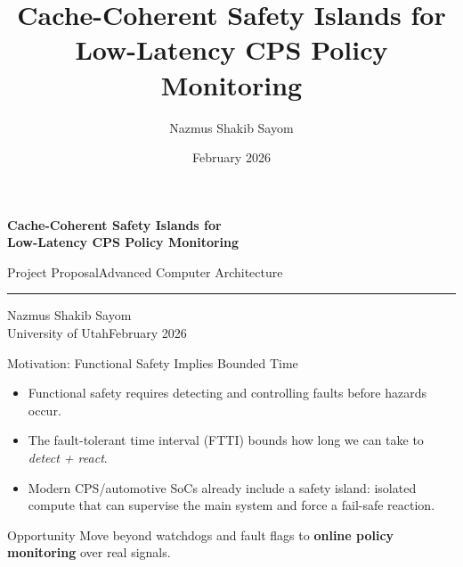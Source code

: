 \documentclass[aspectratio=169,12pt]{beamer}
\title{Cache-Coherent Safety Islands for Low-Latency CPS Policy Monitoring}
\author{Nazmus Shakib Sayom}
\institute{University of Utah}
\date{February 2026}
\newcommand{\hl}[1]{\textcolor{Accent}{\textbf{#1}}}
\newcommand{\SafetyIsland}{safety island\xspace}
\newcommand{\FTTI}{FTTI\xspace}
\begin{document}
\begin{frame}[plain]
  \vfill
  \begin{center}
    {\Large\bfseries\color{Dark}
      Cache-Coherent Safety Islands for\\[6pt]
      Low-Latency CPS Policy Monitoring}

    \vspace{0.5em}
    {\normalsize\color{MidBlue} Project Proposal\;\textperiodcentered\;Advanced Computer Architecture}

    \vspace{1em}
    {\color{Accent}\rule{0.35\textwidth}{1.5pt}}

    \vspace{1.2em}
    {\normalsize Nazmus Shakib Sayom}\\[4pt]
    {\small\color{Muted}University of Utah\;\textperiodcentered\;February 2026}
  \end{center}
  \vfill
\end{frame}
\addtocounter{framenumber}{-1}

\begin{frame}{Motivation: Functional Safety Implies Bounded Time}
\begin{itemize}
\item Functional safety requires detecting and controlling faults before hazards occur.
\item The fault-tolerant time interval (\FTTI) bounds how long we can take to \emph{detect + react}.
\item Modern CPS/automotive SoCs already include a \SafetyIsland: isolated compute that can supervise the main system and force a fail-safe reaction.
\end{itemize}

\vspace{0.6em}
\begin{block}{Opportunity}
Move beyond watchdogs and fault flags to \hl{online policy monitoring} over real signals.
\end{block}
\end{frame}
\end{document}
